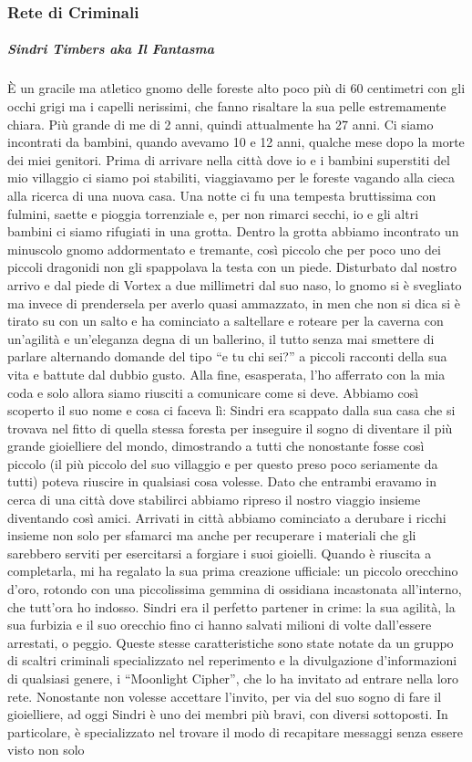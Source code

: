 \documentclass{article}
\begin{document}
              \subsubsection{Rete di Criminali}
                      \subparagraph{Sindri Timbers aka Il Fantasma}
È un gracile ma atletico gnomo delle foreste alto poco più di 60 centimetri con gli occhi grigi ma i capelli nerissimi, che fanno risaltare la sua pelle estremamente chiara. Più grande di me di 2 anni, quindi attualmente ha 27 anni. Ci siamo incontrati da bambini, quando avevamo 10 e 12 anni, qualche mese dopo la morte dei miei genitori. Prima di arrivare nella città dove io e i bambini superstiti del mio villaggio ci siamo poi stabiliti, viaggiavamo per le foreste vagando alla cieca alla ricerca di una nuova casa. Una notte ci fu una tempesta bruttissima con fulmini, saette e pioggia torrenziale e, per non rimarci secchi, io e gli altri bambini ci siamo rifugiati in una grotta. Dentro la grotta abbiamo incontrato un minuscolo gnomo addormentato e tremante, così piccolo che per poco uno dei piccoli dragonidi non gli spappolava la testa con un piede. Disturbato dal nostro arrivo e dal piede di Vortex a due millimetri dal suo naso, lo gnomo si è svegliato ma invece di prendersela per averlo quasi ammazzato, in men che non si dica si è tirato su con un salto e ha cominciato a saltellare e roteare per la caverna con un’agilità e un’eleganza degna di un ballerino, il tutto senza mai smettere di parlare alternando domande del tipo “e tu chi sei?” a piccoli racconti della sua vita e battute dal dubbio gusto. Alla fine, esasperata, l’ho afferrato con la mia coda e solo allora siamo riusciti a comunicare come si deve. Abbiamo così scoperto il suo nome e cosa ci faceva lì: Sindri era scappato dalla sua casa che si trovava nel fitto di quella stessa foresta per inseguire il sogno di diventare il più grande gioielliere del mondo, dimostrando a tutti che nonostante fosse così piccolo (il più piccolo del suo villaggio e per questo preso poco seriamente da tutti) poteva riuscire in qualsiasi cosa volesse. Dato che entrambi eravamo in cerca di una città dove stabilirci abbiamo ripreso il nostro viaggio insieme diventando così amici. Arrivati in città abbiamo cominciato a derubare i ricchi insieme non solo per sfamarci ma anche per recuperare i materiali che gli sarebbero serviti per esercitarsi a forgiare i suoi gioielli. Quando è riuscita a completarla, mi ha regalato la sua prima creazione ufficiale: un piccolo orecchino d’oro, rotondo con una piccolissima gemmina di ossidiana incastonata all’interno, che tutt’ora ho indosso. Sindri era il perfetto partener in crime: la sua agilità, la sua furbizia e il suo orecchio fino ci hanno salvati milioni di volte dall’essere arrestati, o peggio. Queste stesse caratteristiche sono state notate da un gruppo di scaltri criminali specializzato nel reperimento e la divulgazione d’informazioni di qualsiasi genere, i “Moonlight Cipher”, che lo ha invitato ad entrare nella loro rete. Nonostante non volesse accettare l’invito, per via del suo sogno di fare il gioielliere, ad oggi Sindri è uno dei membri più bravi, con diversi sottoposti. In particolare, è specializzato nel trovare il modo di recapitare messaggi senza essere visto non solo 
\end{document}
